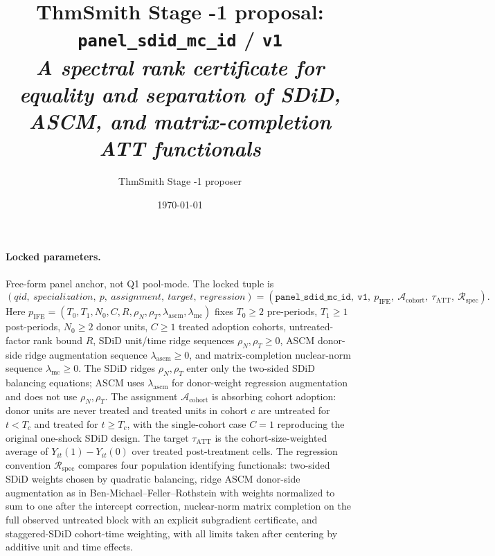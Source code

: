 \documentclass[11pt]{article}
\title{ThmSmith Stage -1 proposal: \texttt{panel\_sdid\_mc\_id} / \texttt{v1}%
  \\ \large\textit{A spectral rank certificate for equality and separation of SDiD, ASCM, and matrix-completion ATT functionals}}
\author{ThmSmith Stage -1 proposer}
\date{\today}
\theoremstyle{definition}
\theoremstyle{plain}
\theoremstyle{remark}
\begin{document}
\maketitle


\paragraph{Locked parameters.}
Free-form panel anchor, not Q1 pool-mode.  The locked tuple is
\[
(qid,\ specialization,\ p,\ assignment,\ target,\ regression)
=
(\texttt{panel\_sdid\_mc\_id},\ \texttt{v1},\ p_{\mathrm{IFE}},\ \mathcal A_{\mathrm{cohort}},\ \tau_{\mathrm{ATT}},\ \mathcal R_{\mathrm{spec}}).
\]
Here \(p_{\mathrm{IFE}}=(T_0,T_1,N_0,C,R,\rho_N,\rho_T,\lambda_{\mathrm{ascm}},\lambda_{\mathrm{mc}})\) fixes \(T_0\ge 2\) pre-periods, \(T_1\ge 1\) post-periods, \(N_0\ge 2\) donor units, \(C\ge 1\) treated adoption cohorts, untreated-factor rank bound \(R\), SDiD unit/time ridge sequences \(\rho_N,\rho_T\ge 0\), ASCM donor-side ridge augmentation sequence \(\lambda_{\mathrm{ascm}}\ge 0\), and matrix-completion nuclear-norm sequence \(\lambda_{\mathrm{mc}}\ge 0\).  The SDiD ridges \(\rho_N,\rho_T\) enter only the two-sided SDiD balancing equations; ASCM uses \(\lambda_{\mathrm{ascm}}\) for donor-weight regression augmentation and does not use \(\rho_N,\rho_T\).  The assignment \(\mathcal A_{\mathrm{cohort}}\) is absorbing cohort adoption: donor units are never treated and treated units in cohort \(c\) are untreated for \(t<T_c\) and treated for \(t\ge T_c\), with the single-cohort case \(C=1\) reproducing the original one-shock SDiD design.  The target \(\tau_{\mathrm{ATT}}\) is the cohort-size-weighted average of \(Y_{it}(1)-Y_{it}(0)\) over treated post-treatment cells.  The regression convention \(\mathcal R_{\mathrm{spec}}\) compares four population identifying functionals: two-sided SDiD weights chosen by quadratic balancing, ridge ASCM donor-side augmentation as in Ben-Michael--Feller--Rothstein with weights normalized to sum to one after the intercept correction, nuclear-norm matrix completion on the full observed untreated block with an explicit subgradient certificate, and staggered-SDiD cohort-time weighting, with all limits taken after centering by additive unit and time effects.
\end{document}
